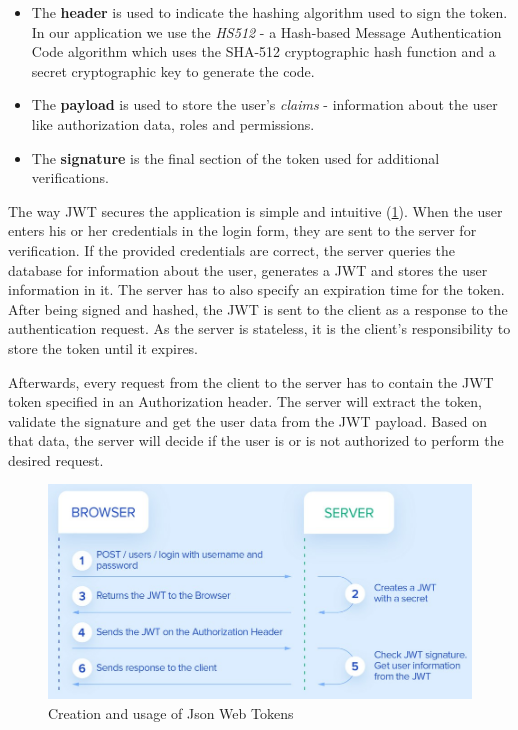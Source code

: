 \begin{itemize}
    \item The \textbf{header} is used to indicate the hashing algorithm used to sign the token. In our application we use the \textit{HS512} - a Hash-based Message Authentication Code algorithm which uses the SHA-512 cryptographic hash function and a secret cryptographic key to generate the code.
    \item The \textbf{payload} is used to store the user's \textit{claims} - information about the user like authorization data, roles and permissions.
    \item The \textbf{signature} is the final section of the token used for additional verifications.
\end{itemize}

The way JWT secures the application is simple and intuitive (\ref{jwtFlow}). When the user enters his or her credentials in the login form, they are sent to the server for verification. If the provided credentials are correct, the server queries the database for information about the user, generates a JWT and stores the user information in it. The server has to also specify an expiration time for the token. After being signed and hashed, the JWT is sent to the client as a response to the authentication request. As the server is stateless, it is the client's responsibility to store the token until it expires.

Afterwards, every request from the client to the server has to contain the JWT token specified in an Authorization header. The server will extract the token, validate the signature and get the user data from the JWT payload. Based on that data, the server will decide if the user is or is not authorized to perform the desired request.

\begin{figure}[H]
    \centering
    \includegraphics[width=5in]{images/jwtFlow}
    \caption{Creation and usage of Json Web Tokens \cite{jwtFlow}}
    \label{jwtFlow}
\end{figure}


